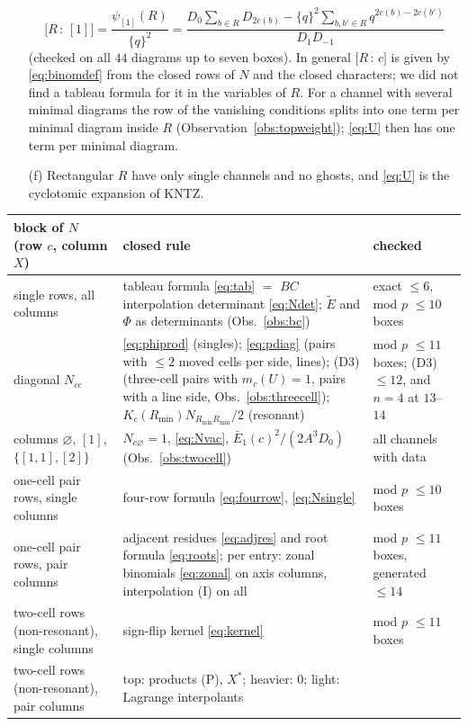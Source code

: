 \documentclass[11pt]{article}
\newcommand{\Et}{\widetilde{E}}
\newcommand{\vac}{\varnothing}
\newcommand{\cf}[2]{\bigl[#1\,{:}\,#2\bigr]}
\begin{document}
\begin{itemize}
\[
\cf R{[1]}=\frac{\psi_{[1]}(R)}{\{q\}^2}=\frac{D_0\sum_{b\in R}D_{2c(b)}-\{q\}^2\sum_{b,b'\in R}q^{2c(b)-2c(b')}}{D_1D_{-1}}
\]
(checked on all $44$ diagrams up to seven boxes).  In general $\cf Rc$ is given by \eqref{eq:binomdef} from the closed rows of $N$ and the
closed characters; we did not find a tableau formula for it in the variables of $R$.  For a channel with several minimal
diagrams the row of the vanishing conditions splits into one term per minimal diagram inside $R$
(Observation~\ref{obs:topweight}); \eqref{eq:U} then has one term per minimal diagram.
\item[(f)] Rectangular $R$ have only single channels and no ghosts, and \eqref{eq:U} is the cyclotomic expansion of KNTZ.
\end{itemize}

\begin{table}[htp]
\centering
\small
\begin{tabular}{p{}p{}p{}}
\toprule
block of $N$ (row $c$, column $X$) & closed rule & checked\\
\midrule
single rows, all columns & tableau formula \eqref{eq:tab} $=$ $BC$ interpolation determinant \eqref{eq:Ndet}; $\Et$ and
$\Phi$ as determinants (Obs.~\ref{obs:bc}) & exact $\le6$, mod $p$ $\le10$ boxes\\
diagonal $N_{cc}$ & \eqref{eq:phiprod} (singles); \eqref{eq:pdiag} (pairs with $\le2$ moved cells per side, lines);
(D3) (three-cell pairs with $m_c(U)=1$, pairs with a line side, Obs.~\ref{obs:threecell});
$K_c(R_{\min})N_{R_{\min}R_{\min}}/2$ (resonant) & mod $p$ $\le11$ boxes; (D3) $\le12$, and $n=4$ at $13$--$14$\\
columns $\vac$, $[1]$, $\{[1,1],[2]\}$ & $N_{c\vac}=1$, \eqref{eq:Nvac}, $\bar E_1(c)^2/(2A^3D_0)$ (Obs.~\ref{obs:twocell}) & all channels with data\\
one-cell pair rows, single columns & four-row formula \eqref{eq:fourrow}, \eqref{eq:Nsingle} & mod $p$ $\le10$ boxes\\
one-cell pair rows, pair columns & adjacent residues \eqref{eq:adjres} and root formula \eqref{eq:roots}; per entry:
zonal binomials \eqref{eq:zonal} on axis columns, interpolation (I) on all & mod $p$ $\le11$ boxes, generated $\le14$\\
two-cell rows (non-resonant), single columns & sign-flip kernel \eqref{eq:kernel} & mod $p$ $\le11$ boxes\\
two-cell rows (non-resonant), pair columns & top: products (P), $X^*$; heavier: $0$; light: Lagrange interpolants

\end{tabular}
\end{table}
\end{document}
